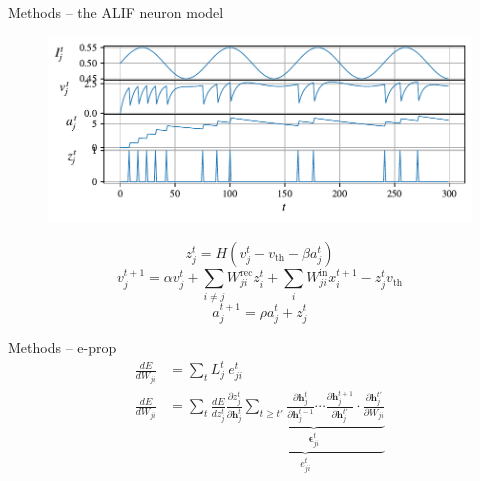 \documentclass[t]{beamer}
\begin{document}

\begin{frame}{Methods -- the ALIF neuron model}
  \begin{figure}[!ht]
    \centering
    \includegraphics[width=0.9\linewidth]{simplealif}
  \end{figure}
  \footnotesize
  \begin{equation}
  z^t_j = H\left(v_j^t - v_\text{th} - \beta a^t_j\right)
  \end{equation}
  \begin{equation}\label{eq:alifV}
  v^{t+1}_j = \alpha v_j^t + \sum_{i\neq j}W^\text{rec}_{ji}z_i^t + \sum_i W^\text{in}_{ji}x_i^{t+1} - z_j^tv_
  \text{th}
  \end{equation}
  \begin{equation}\label{eq:alifA}
  a^{t+1}_j = \rho a^t_j + z^t_j
  \end{equation}
\end{frame}

\begin{frame}{Methods -- e-prop}
  \begin{align*}
    \frac{dE}{dW_{ji}} &= \sum_tL^t_j\ e^t_{ji}\\
    \frac{dE}{dW_{ji}} &= \sum_t\frac{dE}{dz_j^t}\underbrace{\frac{\partial z_j^t}{\partial\mathbf{h}_j^t}\underbrace{\sum_{t\geq t'}\frac{\partial\mathbf{h}^t_j}{\partial\mathbf{h}_j^{t-1}} \cdots \frac{\partial\mathbf{h}_j^{t+1}}{\partial\mathbf{h}_j^{t'}}\cdot\frac{\partial\mathbf{h}_j^{t'}}{\partial W_{ji}}}_{\mathbf{\epsilon}_{ji}^t}}_{e^t_{ji}}
    \end{align*}

\end{frame}
\end{document}
